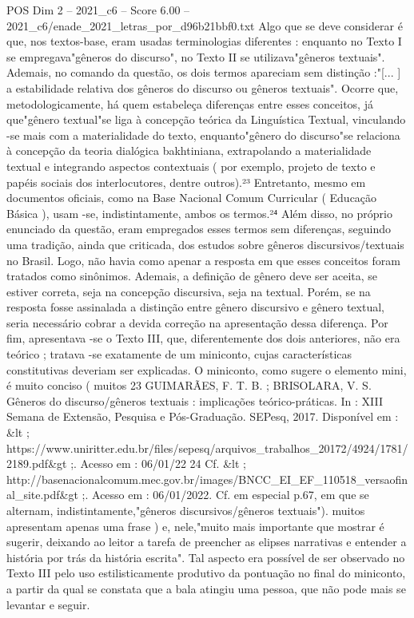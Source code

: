 \begin{textsample}{POS Dim 2 – 2021\_c6 – Score 6.00 – 2021\_c6/enade\_2021\_letras\_por\_d96b21bbf0.txt}
Algo que se deve considerar é que, nos textos-base, eram usadas terminologias diferentes : enquanto no Texto I se empregava"gêneros do discurso", no Texto II se utilizava"gêneros textuais".
Ademais, no comando da questão, os dois termos apareciam sem distinção :"[... ] a estabilidade relativa dos gêneros do discurso ou gêneros textuais".
Ocorre que, metodologicamente, há quem estabeleça diferenças entre esses conceitos, já que"gênero textual"se liga à concepção teórica da Linguística Textual, vinculando -se mais com a materialidade do texto, enquanto"gênero do discurso"se relaciona à concepção da teoria dialógica bakhtiniana, extrapolando a materialidade textual e integrando aspectos contextuais ( por exemplo, projeto de texto e papéis sociais dos interlocutores, dentre outros).²³ Entretanto, mesmo em documentos oficiais, como na Base Nacional Comum Curricular ( Educação Básica ), usam -se, indistintamente, ambos os termos.²⁴ Além disso, no próprio enunciado da questão, eram empregados esses termos sem diferenças, seguindo uma tradição, ainda que criticada, dos estudos sobre gêneros discursivos/textuais no Brasil.
Logo, não havia como apenar a resposta em que esses conceitos foram tratados como sinônimos.
Ademais, a definição de gênero deve ser aceita, se estiver correta, seja na concepção discursiva, seja na textual.
Porém, se na resposta fosse assinalada a distinção entre gênero discursivo e gênero textual, seria necessário cobrar a devida correção na apresentação dessa diferença.
Por fim, apresentava -se o Texto III, que, diferentemente dos dois anteriores, não era teórico ; tratava -se exatamente de um miniconto, cujas características constitutivas deveriam ser explicadas.
O miniconto, como sugere o elemento mini, é muito conciso ( muitos 23 GUIMARÃES, F.
T.
B. ; BRISOLARA, V.
S.
Gêneros do discurso/gêneros textuais : implicações teórico-práticas.
In : XIII Semana de Extensão, Pesquisa e Pós-Graduação.
SEPesq, 2017.
Disponível em : \&lt ; https://www.uniritter.edu.br/files/sepesq/arquivos\_trabalhos\_20172/4924/1781/2189.pdf\&gt ;.
Acesso em : 06/01/22 24 Cf. \&lt ; http://basenacionalcomum.mec.gov.br/images/BNCC\_EI\_EF\_110518\_versaofinal\_site.pdf\&gt ;.
Acesso em : 06/01/2022.
Cf. em especial p.67, em que se alternam, indistintamente,"gêneros discursivos/gêneros textuais"). muitos apresentam apenas uma frase ) e, nele,"muito mais importante que mostrar é sugerir, deixando ao leitor a tarefa de preencher as elipses narrativas e entender a história por trás da história escrita".
Tal aspecto era possível de ser observado no Texto III pelo uso estilisticamente produtivo da pontuação no final do miniconto, a partir da qual se constata que a bala atingiu uma pessoa, que não pode mais se levantar e seguir.

\end{textsample}
